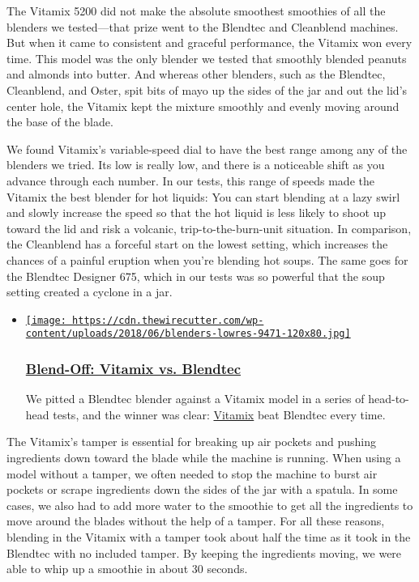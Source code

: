 The Vitamix 5200 did not make the absolute smoothest smoothies of all
the blenders we tested---that prize went to the Blendtec and Cleanblend
machines. But when it came to consistent and graceful performance, the
Vitamix won every time. This model was the only blender we tested that
smoothly blended peanuts and almonds into butter. And whereas other
blenders, such as the Blendtec, Cleanblend, and Oster, spit bits of mayo
up the sides of the jar and out the lid's center hole, the Vitamix kept
the mixture smoothly and evenly moving around the base of the blade.

We found Vitamix's variable-speed dial to have the best range among any
of the blenders we tried. Its low is really low, and there is a
noticeable shift as you advance through each number. In our tests, this
range of speeds made the Vitamix the best blender for hot liquids: You
can start blending at a lazy swirl and slowly increase the speed so that
the hot liquid is less likely to shoot up toward the lid and risk a
volcanic, trip-to-the-burn-unit situation. In comparison, the Cleanblend
has a forceful start on the lowest setting, which increases the chances
of a painful eruption when you're blending hot soups. The same goes for
the Blendtec Designer 675, which in our tests was so powerful that the
soup setting created a cyclone in a jar.

\begin{itemize}
\item
  \href{https://www.nytimes3xbfgragh.onion/wirecutter/reviews/vitamix-vs-blendtec/}{\texttt{[image: https://cdn.thewirecutter.com/wp-content/uploads/2018/06/blenders-lowres-9471-120x80.jpg]}}

  \hypertarget{blend-off-vitamix-vs-blendtec}{%
  \subsubsection{\texorpdfstring{\href{https://www.nytimes3xbfgragh.onion/wirecutter/reviews/vitamix-vs-blendtec/}{Blend-Off:
  Vitamix vs.
  Blendtec}}{Blend-Off: Vitamix vs. Blendtec}}\label{blend-off-vitamix-vs-blendtec}}

  We pitted a Blendtec blender against a Vitamix model in a series of
  head-to-head tests, and the winner was clear:
  \href{https://wclink.co/link/7761/0/4/76786/}{Vitamix} beat Blendtec
  every time.
\end{itemize}

The Vitamix's tamper is essential for breaking up air pockets and
pushing ingredients down toward the blade while the machine is running.
When using a model without a tamper, we often needed to stop the machine
to burst air pockets or scrape ingredients down the sides of the jar
with a spatula. In some cases, we also had to add more water to the
smoothie to get all the ingredients to move around the blades without
the help of a tamper. For all these reasons, blending in the Vitamix
with a tamper took about half the time as it took in the Blendtec with
no included tamper. By keeping the ingredients moving, we were able to
whip up a smoothie in about 30 seconds.

